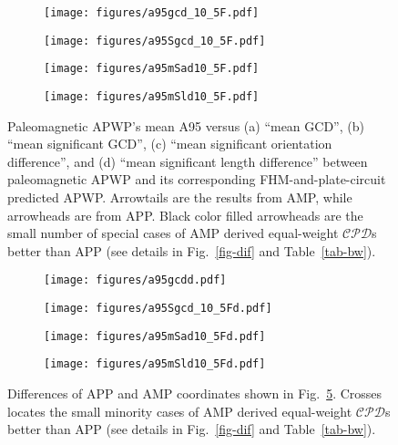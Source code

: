 \begin{figure}
\captionsetup[subfigure]{singlelinecheck=off,justification=raggedright,aboveskip=-6pt,belowskip=-6pt}
\centering
  \begin{subfigure}[htbp]{.49\textwidth}
	\caption{}\texttt{[image: figures/a95gcd\_10\_5F.pdf]}\label{fig-A95GCD105F}
  \end{subfigure}
  \begin{subfigure}[htbp]{.49\textwidth}
	\caption{}\texttt{[image: figures/a95Sgcd\_10\_5F.pdf]}\label{fig-A95SGCD105F}
  \end{subfigure}
  \begin{subfigure}[htbp]{.49\textwidth}
	\caption{}\texttt{[image: figures/a95mSad10\_5F.pdf]}\label{fig-A95mSad105F}
  \end{subfigure}
  \begin{subfigure}[htbp]{.49\textwidth}
	\caption{}\texttt{[image: figures/a95mSld10\_5F.pdf]}\label{fig-A95mSld105F}
  \end{subfigure}
\caption[APP spatially better than AMP]{Paleomagnetic APWP's mean A95 versus
(a) ``mean GCD'', (b) ``mean significant GCD'', (c) ``mean significant
orientation difference'', and (d) ``mean significant length difference'' between
paleomagnetic APWP and its corresponding FHM-and-plate-circuit predicted APWP\@.
Arrowtails are the results from AMP, while arrowheads are from APP\@. Black
color filled arrowheads are the small number of special cases of AMP derived
equal-weight $\mathcal{CPD}$s better than APP (see details in Fig.~\ref{fig-dif}
and Table~\ref{tab-bw}).}\label{fig-A95mG105F}
\end{figure}

\begin{figure}
\captionsetup[subfigure]{singlelinecheck=off,justification=raggedright,aboveskip=-6pt,belowskip=-6pt}
\centering
  \begin{subfigure}[htbp]{.49\textwidth}
	\caption{}\texttt{[image: figures/a95gcdd.pdf]}\label{fig-A95GCD105Fd}
  \end{subfigure}
  \begin{subfigure}[htbp]{.49\textwidth}
	\caption{}\texttt{[image: figures/a95Sgcd\_10\_5Fd.pdf]}\label{fig-A95SGCD105Fd}
  \end{subfigure}
  \begin{subfigure}[htbp]{.49\textwidth}
	\caption{}\texttt{[image: figures/a95mSad10\_5Fd.pdf]}\label{fig-A95mSad105Fd}
  \end{subfigure}
  \begin{subfigure}[htbp]{.49\textwidth}
	\caption{}\texttt{[image: figures/a95mSld10\_5Fd.pdf]}\label{fig-A95mSld105Fd}
  \end{subfigure}
\caption[APP spatially better than AMP]{Differences of APP and AMP coordinates
shown in Fig.~\ref{fig-A95mG105F}. Crosses locates the small minority cases of
AMP derived equal-weight $\mathcal{CPD}$s better than APP (see details in
Fig.~\ref{fig-dif} and Table~\ref{tab-bw}).}\label{fig-A95mG105Fd}
\end{figure}

